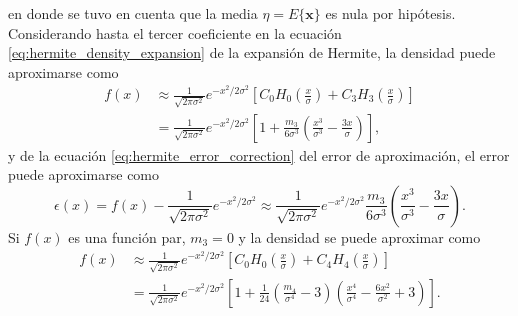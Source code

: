 \documentclass[a4paper]{report}
\newcommand{\x}{\mathbf{x}}
\begin{document}
en donde se tuvo en cuenta que la media \(\eta=E\{\x\}\) es nula por hipótesis. Considerando hasta el tercer coeficiente en la ecuación \ref{eq:hermite_density_expansion} de la expansión de Hermite, la densidad puede aproximarse como
\begin{align*}
 f(x)&\approx\frac{1}{\sqrt{2\pi\sigma^2}}e^{-x^2/2\sigma^2}\left[C_0H_0\left(\frac{x}{\sigma}\right)+C_3H_3\left(\frac{x}{\sigma}\right)\right]\\
  &=\frac{1}{\sqrt{2\pi\sigma^2}}e^{-x^2/2\sigma^2}\left[1+\frac{m_3}{6\sigma^3}\left(\frac{x^3}{\sigma^3}-\frac{3x}{\sigma}\right)\right],
\end{align*}
y de la ecuación \ref{eq:hermite_error_correction} del error de aproximación, el error puede aproximarse como
\[
 \epsilon(x)=f(x)-\frac{1}{\sqrt{2\pi\sigma^2}}e^{-x^2/2\sigma^2}\approx\frac{1}{\sqrt{2\pi\sigma^2}}e^{-x^2/2\sigma^2}\frac{m_3}{6\sigma^3}\left(\frac{x^3}{\sigma^3}-\frac{3x}{\sigma}\right).
\]
Si \(f(x)\) es una función par, \(m_3=0\) y la densidad se puede aproximar como
\begin{align}\label{eq:hermite_error_correction_fist_order}
 f(x)&\approx\frac{1}{\sqrt{2\pi\sigma^2}}e^{-x^2/2\sigma^2}\left[C_0H_0\left(\frac{x}{\sigma}\right)+C_4H_4\left(\frac{x}{\sigma}\right)\right]\nonumber\\
  &=\frac{1}{\sqrt{2\pi\sigma^2}}e^{-x^2/2\sigma^2}\left[1+\frac{1}{24}\left(\frac{m_4}{\sigma^4}-3\right)\left(\frac{x^4}{\sigma^4}-\frac{6x^2}{\sigma^2}+3\right)\right].
\end{align}
\end{document}
